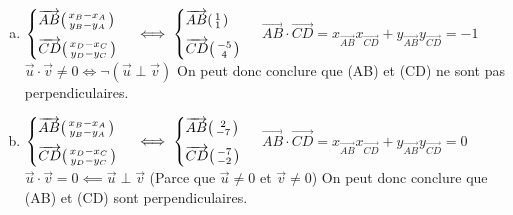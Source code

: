 \documentclass[12pt, a4paper]{article}
\begin{document}
\begin{Exercise}[number={73}]
    \begin{enumerate}[a)]
        \item $\begin{cases}\overrightarrow{AB}\begin{psmallmatrix}x_B-x_A\\y_B-y_A\end{psmallmatrix}\\[0.2cm]\overrightarrow{CD}\begin{psmallmatrix}x_D-x_C\\y_D-y_C\end{psmallmatrix}\end{cases}\iff \begin{cases}\overrightarrow{AB}\begin{psmallmatrix}1\\1\end{psmallmatrix}\\[0.2cm]\overrightarrow{CD}\begin{psmallmatrix}-5\\4\end{psmallmatrix}\end{cases}$ \medbreak $\overrightarrow{AB}\cdot\overrightarrow{CD}=x_{\overrightarrow{AB}}x_{\overrightarrow{CD}}+y_{\overrightarrow{AB}}y_{\overrightarrow{CD}}=-1$ \smallbreak $\vec{u}\cdot\vec{v}\neq0\iff\lnot(\vec{u}\perp\vec{v})$ \smallbreak On peut donc conclure que (AB) et (CD) ne sont pas perpendiculaires.
        \item $\begin{cases}\overrightarrow{AB}\begin{psmallmatrix}x_B-x_A\\y_B-y_A\end{psmallmatrix}\\[0.2cm]\overrightarrow{CD}\begin{psmallmatrix}x_D-x_C\\y_D-y_C\end{psmallmatrix}\end{cases}\iff \begin{cases}\overrightarrow{AB}\begin{psmallmatrix}2\\-7\end{psmallmatrix}\\[0.2cm]\overrightarrow{CD}\begin{psmallmatrix}-7\\-2\end{psmallmatrix}\end{cases}$ \medbreak $\overrightarrow{AB}\cdot\overrightarrow{CD}=x_{\overrightarrow{AB}}x_{\overrightarrow{CD}}+y_{\overrightarrow{AB}}y_{\overrightarrow{CD}}=0$ \medbreak $\vec{u}\cdot\vec{v}=0\impliedby \vec{u}\perp \vec{v}$ \quad (Parce que $\vec{u}\neq0$ et $\vec{v}\neq0$) \smallbreak On peut donc conclure que (AB) et (CD) sont perpendiculaires.

\end{enumerate}
\end{Exercise}
\end{document}
